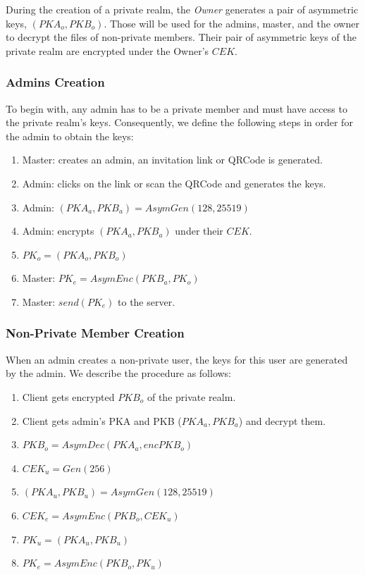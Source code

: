 \documentclass[a4paper,9pt,twoside]{article}
\begin{document}
During the creation of a private realm, the \emph{Owner} 
generates a pair of asymmetric keys, $(PKA_o, PKB_o)$. Those 
will be used for the admins, master, and the owner to decrypt 
the files of non-private members. Their pair of asymmetric keys of 
the private realm are encrypted under the Owner's $CEK$.

\subsubsection{Admins Creation}
To begin with, any admin has to be a private member and must have access
 to the private realm's keys. Consequently, we define the following steps in 
order for the admin to obtain the keys:

\begin{enumerate}
\itemsep0em
\item Master: creates an admin, an invitation link or QRCode is generated.
\item Admin: clicks on the link or scan the QRCode and generates the keys.
\item Admin: $(PKA_a,PKB_a)=AsymGen(128, 25519)$
\item Admin: encrypts $(PKA_a, PKB_a)$ under their $CEK$.
\item $PK_o=(PKA_o, PKB_o)$
\item Master: $PK_e=AsymEnc(PKB_a, PK_o)$
\item Master: $send(PK_e)$ to the server.
\end{enumerate}

\subsubsection{Non-Private Member Creation}

When an admin creates a non-private user, the keys for this user 
are generated by the admin. We describe the procedure as follows:

\begin{enumerate}
\itemsep0em
\item Client gets encrypted $PKB_o$ of the private realm.
\item Client gets admin's PKA and PKB ($PKA_a, PKB_a$) and decrypt them.
\item $PKB_o=AsymDec(PKA_a, encPKB_o)$
\item $CEK_u=Gen(256)$
\item $(PKA_u, PKB_u)=AsymGen(128, 25519)$
\item $CEK_e=AsymEnc(PKB_o, CEK_u)$
\item $PK_u=(PKA_u,PKB_u)$
\item $PK_e=AsymEnc(PKB_o, PK_u)$
\end{enumerate}
\end{document}
